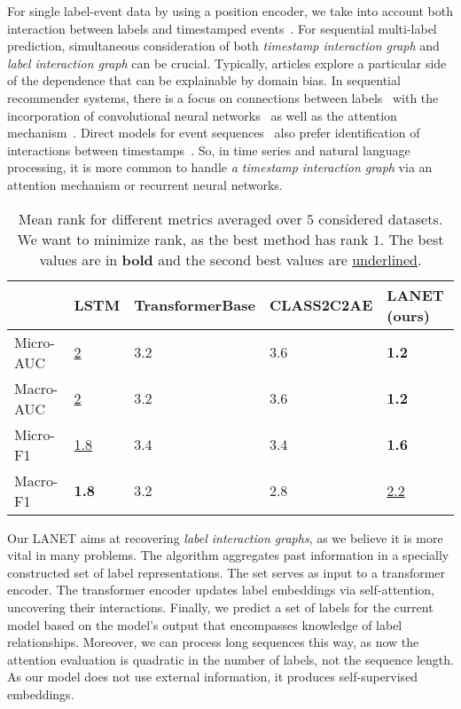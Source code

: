 \documentclass[runningheads]{llncs}
\begin{document}
For single label-event data by using a position encoder, we take into account both interaction between labels and timestamped events~\cite{li2020time,ying2018sequential}.
For sequential multi-label prediction, simultaneous consideration of both \textit{timestamp interaction graph} and \textit{label interaction graph} can be crucial. 
Typically, articles explore a particular side of the dependence that can be explainable by domain bias. In sequential recommender systems, there is a focus on connections between labels~\cite{quadrana2018sequence} with the incorporation of convolutional neural networks~\cite{tang2018personalized} as well as the attention mechanism~\cite{zhang2019next}.
Direct models for event sequences~\cite{hawkes1971spectra} also prefer identification of interactions between timestamps~\cite{zhuzhel2023continuoustime}.
So, in time series and natural language processing, it is more common to handle \textit{a timestamp interaction graph} via an attention mechanism or recurrent neural networks. 

\begin{table}[th]
\centering
\small
\begin{tabular}{p{2cm}p{1.5cm}p{2.8cm}p{2.5cm}p{2.4cm}}
\hline
  & LSTM & TransformerBase & CLASS2C2AE & LANET (ours) \\
\hline
Micro-AUC & \underline{2} & 3.2 & 3.6 & \textbf{1.2} \\
Macro-AUC & \underline{2} & 3.2 & 3.6 & \textbf{1.2} \\
Micro-F1 & \underline{1.8} & 3.4 & 3.4 & \textbf{1.6} \\
Macro-F1 & \textbf{1.8} & 3.2 & 2.8 & \underline{2.2} \\
\hline
\end{tabular}
\centering
\caption{Mean rank for different metrics averaged over $5$ considered datasets. We want to minimize rank, as the best method has rank $1$. The best values are in \textbf{bold} and the second best values are \underline{underlined}.}
\label{table:rank_results}
\end{table}

Our LANET aims at recovering \textit{label interaction graphs}, as we believe it is more vital in many problems.
The algorithm aggregates past information in a specially constructed set of label representations.
The set serves as input to a transformer encoder. 
The transformer encoder updates label embeddings via self-attention, uncovering their interactions. 
Finally, we predict a set of labels for the current model based on the model's output that encompasses knowledge of label relationships. Moreover, we can process long sequences this way, as now the attention evaluation is quadratic in the number of labels, not the sequence length.
As our model does not use external information, it produces self-supervised embeddings.
\end{document}
